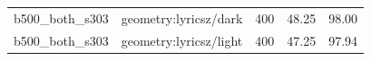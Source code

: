 \begin{longtable}{l>{\raggedright\arraybackslash}p{.42\linewidth}rrr}
b500\_\allowbreak{}both\_\allowbreak{}s303 & %
geometry:lyricsz/dark & %
400 & %
48.25 & %
98.00 \\ %

b500\_\allowbreak{}both\_\allowbreak{}s303 & %
geometry:lyricsz/light & %
400 & %
47.25 & %
97.94 \\ %


\end{longtable}
